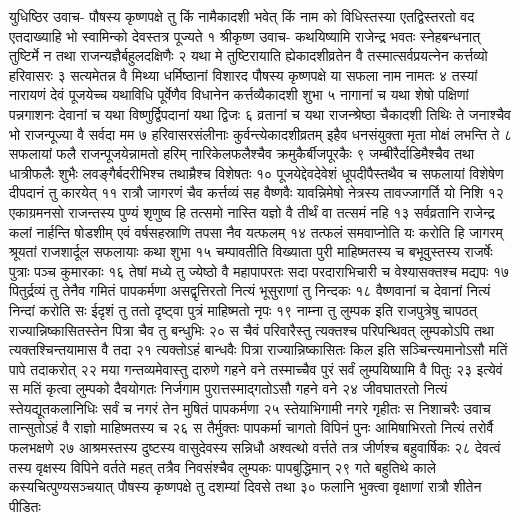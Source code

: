 युधिष्ठिर उवाच-
पौषस्य  कृष्णपक्षे तु किं नामैकादशी भवेत् 
किं नाम को विधिस्तस्या एतद्विस्तरतो वद 
एतदाख्याहि भो स्वामिन्को देवस्तत्र पूज्यते १
श्रीकृष्ण उवाच-
कथयिष्यामि राजेन्द्र भवतः स्नेहबन्धनात् 
तुष्टिर्मे न तथा राजन्यज्ञैर्बहुलदक्षिणैः २
यथा मे तुष्टिरायाति ह्येकादशीव्रतेन वै 
तस्मात्सर्वप्रयत्नेन कर्त्तव्यो हरिवासरः ३
सत्यमेतन्न वै मिथ्या धर्मिष्ठानां विशारद 
पौषस्य कृष्णपक्षे या सफला नाम नामतः ४
तस्यां नारायणं देवं पूजयेच्च यथाविधि 
पूर्वेणैव विधानेन कर्त्तव्यैकादशी शुभा ५
नागानां च यथा शेषो पक्षिणां पन्नगाशनः 
देवानां च यथा विष्णुर्द्विपदानां यथा द्विजः ६
व्रतानां च यथा राजन्श्रेष्ठा चैकादशी तिथिः 
ते जनाश्चैव भो राजन्पूज्या वै सर्वदा मम ७
हरिवासरसंलीनाः कुर्वन्त्येकादशीव्रतम् 
इहैव धनसंयुक्ता मृता मोक्षं लभन्ति ते ८
सफलायां फलै राजन्पूजयेन्नामतो हरिम् 
नारिकेलफलैश्चैव क्रमुकैर्बीजपूरकैः ९
जम्बीरैर्दाडिमैश्चैव तथा धात्रीफलैः शुभैः 
लवङ्गैर्बदरीभिश्च तथाम्रैश्च विशेषतः १०
पूजयेद्देवदेवेशं धूपदीपैस्तथैव च 
सफलायां विशेषेण दीपदानं तु कारयेत् ११
रात्रौ जागरणं चैव कर्त्तव्यं सह वैष्णवैः 
यावन्निमेषो नेत्रस्य तावज्जागर्ति यो निशि १२
एकाग्रमनसो राजन्तस्य पुण्यं शृणुष्व हि 
तत्समो नास्ति यज्ञो वै तीर्थं वा तत्समं नहि १३
सर्वव्रतानि राजेन्द्र कलां नार्हन्ति षोडशीम् 
एवं वर्षसहस्राणि तपसा नैव यत्फलम् १४
तत्फलं समवाप्नोति यः करोति हि जागरम् 
श्रूयतां राजशार्दूल सफलायाः कथा शुभा १५
चम्पावतीति विख्याता पुरी माहिष्मतस्य च 
बभूवुस्तस्य राजर्षेः पुत्राः पञ्च कुमारकाः १६
तेषां मध्ये तु ज्येष्ठो वै महापापरतः सदा 
परदाराभिचारी च वेश्यासक्तश्च मद्यपः १७
पितुर्द्रव्यं तु तेनैव गमितं पापकर्मणा 
असद्वृत्तिरतो नित्यं भूसुराणां तु निन्दकः १८
वैष्णवानां च देवानां नित्यं निन्दां करोति सः 
ईदृशं तु ततो दृष्ट्वा पुत्रं माहिष्मतो नृपः १९
नाम्ना तु लुम्पक इति राजपुत्रेषु चापठत् 
राज्यान्निष्कासितस्तेन पित्रा चैव तु बन्धुभिः २०
स चैवं परिवारैस्तु त्यक्तश्च परिपन्थिवत् 
लुम्पकोऽपि तथा त्यक्तश्चिन्तयामास वै तदा २१
त्यक्तोऽहं बान्धवैः पित्रा राज्यान्निष्कासितः किल 
इति सञ्चिन्त्यमानोऽसौ मतिं पापे तदाकरोत् २२
मया गन्तव्यमेवास्तु दारुणे गहने वने 
तस्माच्चैव पुरं सर्वं लुम्पयिष्यामि वै पितुः २३
इत्येवं स मतिं कृत्वा लुम्पको दैवयोगतः 
निर्जगाम पुरात्तस्माद्गतोऽसौ गहने वने २४
जीवघातरतो नित्यं स्तेयद्यूतकलानिधिः 
सर्वं च नगरं तेन मुषितं पापकर्मणा २५
स्तेयाभिगामी नगरे गृहीतः स निशाचरैः 
उवाच तान्सुतोऽहं वै राज्ञो माहिष्मतस्य च २६
स तैर्मुक्तः पापकर्मा चागतो विपिनं पुनः 
आमिषाभिरतो नित्यं तरोर्वै फलभक्षणे २७
आश्रमस्तस्य दुष्टस्य वासुदेवस्य सन्निधौ 
अश्वत्थो वर्त्तते तत्र जीर्णश्च बहुवार्षिकः २८
देवत्वं तस्य वृक्षस्य विपिने वर्तते महत् 
तत्रैव निवसंश्चैव लुम्पकः पापबुद्धिमान् २९
गते बहुतिथे काले कस्यचित्पुण्यसञ्चयात् 
पौषस्य कृष्णपक्षे तु दशम्यां दिवसे तथा ३०
फलानि भुक्त्वा वृक्षाणां रात्रौ शीतेन पीडितः 
